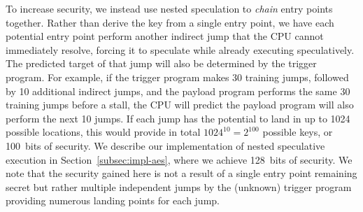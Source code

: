 To increase security, we instead use nested speculation to \emph{chain} entry points
together. Rather than derive
the key from a single entry point, we have each potential entry point perform
another indirect jump that the CPU cannot immediately resolve, forcing it to
speculate while already executing speculatively. The predicted target of that jump
will also be determined by the trigger program. For example, if the trigger
program makes 30 training jumps, followed by 10 additional indirect jumps, and
the payload program performs the same 30 training jumps before a stall, the CPU
will predict the payload program will also perform the next 10 jumps. If each
jump has the potential to land in up to 1024 possible locations, this would
provide in total $1024^{10} = 2^{100}$ possible keys, or 100~bits of security.
We describe our implementation of nested speculative execution in
Section~\ref{subsec:impl-aes}, where we achieve 128~bits of security. We note
that the security gained here is not a result of a single entry point
remaining secret but rather multiple independent jumps by the (unknown) trigger
program providing numerous landing points for each jump.

\FigNestedSpec


\medskip


%
%


% 
% 


